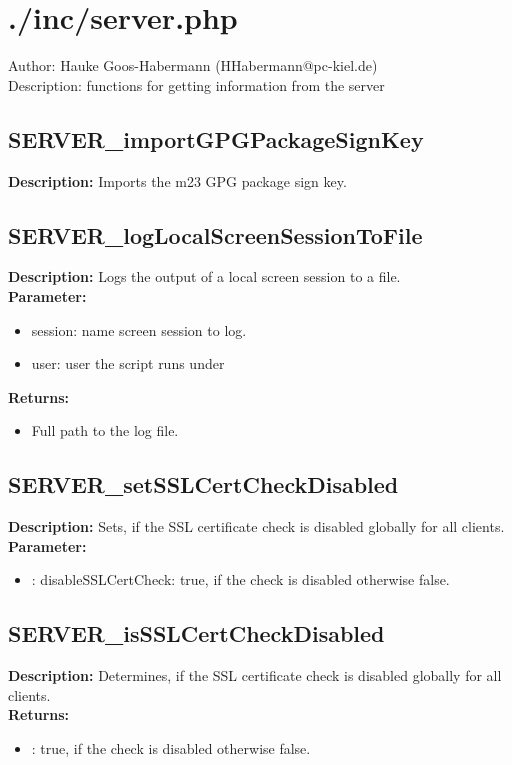 \newpage\section{./inc/server.php}
 Author: Hauke Goos-Habermann (HHabermann@pc-kiel.de)\\
 Description: functions for getting information from the server\\

\subsection{SERVER\_importGPGPackageSignKey}
\textbf{Description:} Imports the m23 GPG package sign key.\\

\subsection{SERVER\_logLocalScreenSessionToFile}
\textbf{Description:} Logs the output of a local screen session to a file.\\
\textbf{Parameter:}
\begin{itemize}
\item session: name screen session to log.
\item user: user the script runs under
\end{itemize}
\textbf{Returns:}
\begin{itemize}
\item Full path to the log file.
\end{itemize}

\subsection{SERVER\_setSSLCertCheckDisabled}
\textbf{Description:} Sets, if the SSL certificate check is disabled globally for all clients.\\
\textbf{Parameter:}
\begin{itemize}
\item : disableSSLCertCheck: true, if the check is disabled otherwise false.
\end{itemize}

\subsection{SERVER\_isSSLCertCheckDisabled}
\textbf{Description:} Determines, if the SSL certificate check is disabled globally for all clients.\\
\textbf{Returns:}
\begin{itemize}
\item : true, if the check is disabled otherwise false.
\end{itemize}

